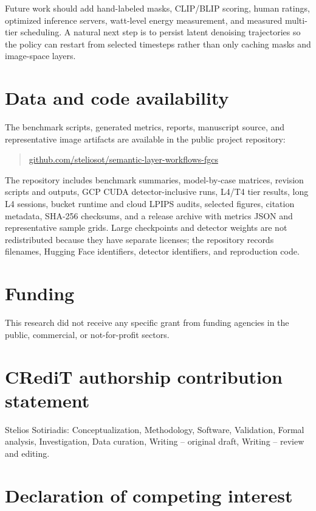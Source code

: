 \documentclass[final,5p,times,number,sort&compress]{elsarticle}
\begin{document}
Future work should add hand-labeled masks, CLIP/BLIP scoring, human ratings, optimized inference servers, watt-level energy measurement, and measured multi-tier scheduling. A natural next step is to persist latent denoising trajectories so the policy can restart from selected timesteps rather than only caching masks and image-space layers.

\section*{Data and code availability}

The benchmark scripts, generated metrics, reports, manuscript source, and representative image artifacts are available in the public project repository:
\begin{quote}
\small\href{https://github.com/steliosot/semantic-layer-workflows-fgcs}{github.com/steliosot/semantic-layer-workflows-fgcs}
\end{quote}
The repository includes benchmark summaries, model-by-case matrices, revision scripts and outputs, GCP CUDA detector-inclusive runs, L4/T4 tier results, long L4 sessions, bucket runtime and cloud LPIPS audits, selected figures, citation metadata, SHA-256 checksums, and a release archive with metrics JSON and representative sample grids. Large checkpoints and detector weights are not redistributed because they have separate licenses; the repository records filenames, Hugging Face identifiers, detector identifiers, and reproduction code.

\section*{Funding}

This research did not receive any specific grant from funding agencies in the public, commercial, or not-for-profit sectors.

\section*{CRediT authorship contribution statement}

Stelios Sotiriadis: Conceptualization, Methodology, Software, Validation, Formal analysis, Investigation, Data curation, Writing -- original draft, Writing -- review and editing.

\section*{Declaration of competing interest}
\end{document}
